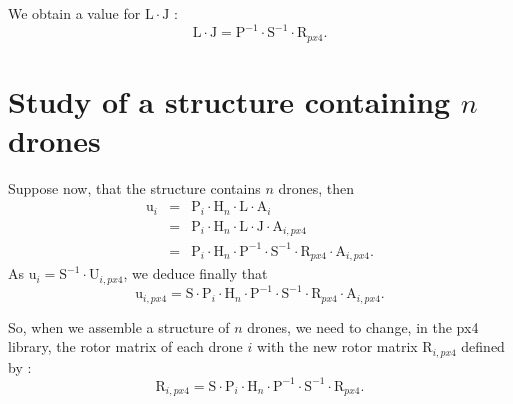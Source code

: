 \documentclass[a4paper]{article}
\newcommand{\UB}[1]{ \bm{\mathrm{#1}} }
\begin{document}
We obtain a value for $\UB{L} \cdot \UB{J}$ : 
$$
\UB{L} \cdot \UB{J}
=
\UB{P}^{-1}
\cdot
\UB{S}^{-1}
\cdot
\UB{R}_{px4}.
$$

\section{Study of a structure containing $n$ drones}

Suppose now, that the structure contains $n$ drones, then
$$
\begin{array}{rcl}
\UB{u}_i
    & = &
    \UB{P}_i
    \cdot
    \UB{H}_n
    \cdot
    \UB{L}
    \cdot
    \UB{A}_{i}
\\
    & = &
    \UB{P}_i
    \cdot
    \UB{H}_n
    \cdot
    \UB{L}
    \cdot
    \UB{J}
    \cdot
    \UB{A}_{i,px4}
\\
    & = &
    \UB{P}_i
    \cdot
    \UB{H}_n
    \cdot
    \UB{P}^{-1}
    \cdot
    \UB{S}^{-1}
    \cdot
    \UB{R}_{px4}
    \cdot
    \UB{A}_{i,px4}.
\end{array}
$$
As $\UB{u}_i = \UB{S}^{-1} \cdot \UB{U}_{i,px4}$, we deduce finally that
$$
\UB{u}_{i,px4}
=
\UB{S}
\cdot
\UB{P}_i
\cdot
\UB{H}_n
\cdot
\UB{P}^{-1}
\cdot
\UB{S}^{-1}
\cdot
\UB{R}_{px4}
\cdot
\UB{A}_{i,px4}.
$$

So, when we assemble a structure of $n$ drones, we need to change, in the px4 library, the rotor matrix of each drone $i$ 
with the new rotor matrix $\UB{R}_{i,px4}$ defined by :
$$
\UB{R}_{i,px4}
=
\UB{S}
\cdot
\UB{P}_i
\cdot
\UB{H}_n
\cdot
\UB{P}^{-1}
\cdot
\UB{S}^{-1}
\cdot
\UB{R}_{px4}
.
$$
\end{document}
